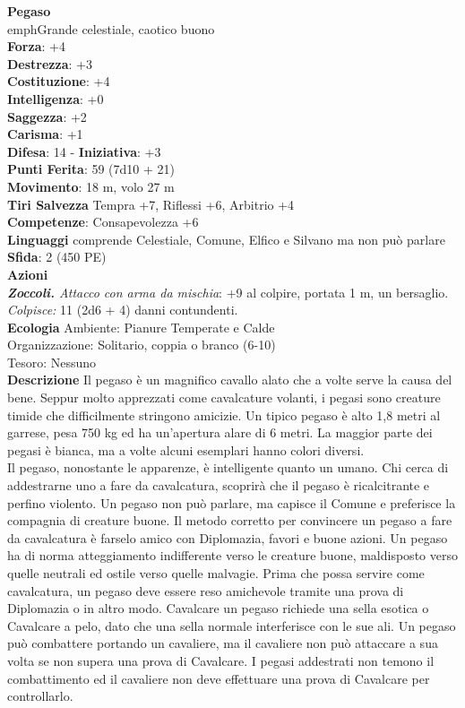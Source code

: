 \begin{multicols}{2}
\medskip\textbf{Pegaso}\\
emph{Grande celestiale, caotico buono}\\
\textbf{Forza}: +4\\
\textbf{Destrezza}: +3\\
\textbf{Costituzione}: +4\\
\textbf{Intelligenza}: +0\\
\textbf{Saggezza}: +2\\
\textbf{Carisma}: +1\\
\textbf{Difesa}: 14 - \textbf{Iniziativa}: +3\\
\textbf{Punti Ferita}: 59 (7d10 + 21)\\
\textbf{Movimento}: 18 m, volo 27 m\\
\textbf{Tiri Salvezza} Tempra +7, Riflessi +6, Arbitrio +4\\
\textbf{Competenze}: Consapevolezza +6\\
\textbf{Linguaggi} comprende Celestiale, Comune, Elfico e Silvano ma non può parlare\\
\textbf{Sfida}: 2 (450 PE)\smallskip\\
\smallskip\textbf{Azioni}\\
\emph{\textbf{Zoccoli.} Attacco con arma da mischia}: +9 al colpire, portata 1 m, un bersaglio.\\
\emph{Colpisce:} 11 (2d6 + 4) danni contundenti.\\
\textbf{Ecologia}
Ambiente: Pianure Temperate e Calde\\
Organizzazione: Solitario, coppia o branco (6-10)\\
Tesoro: Nessuno\\
\textbf{Descrizione}
Il pegaso è un magnifico cavallo alato che a volte serve la causa del bene. Seppur molto apprezzati come cavalcature volanti, i pegasi sono creature timide che difficilmente stringono amicizie. Un tipico pegaso è alto 1,8 metri al garrese, pesa 750 kg ed ha un’apertura alare di 6 metri. La maggior parte dei pegasi è bianca, ma a volte alcuni esemplari hanno colori diversi.\\

Il pegaso, nonostante le apparenze, è intelligente quanto un umano. Chi cerca di addestrarne uno a fare da cavalcatura, scoprirà che il pegaso è ricalcitrante e perfino violento. Un pegaso non può parlare, ma capisce il Comune e preferisce la compagnia di creature buone. Il metodo corretto per convincere un pegaso a fare da cavalcatura è farselo amico con Diplomazia, favori e buone azioni. Un pegaso ha di norma atteggiamento indifferente verso le creature buone, maldisposto verso quelle neutrali ed ostile verso quelle malvagie. Prima che possa servire come cavalcatura, un pegaso deve essere reso amichevole tramite una prova di Diplomazia o in altro modo. Cavalcare un pegaso richiede una sella esotica o Cavalcare a pelo, dato che una sella normale interferisce con le sue ali. Un pegaso può combattere portando un cavaliere, ma il cavaliere non può attaccare a sua volta se non supera una prova di Cavalcare. I pegasi addestrati non temono il combattimento ed il cavaliere non deve effettuare una prova di Cavalcare per controllarlo.\\


\end{multicols}
